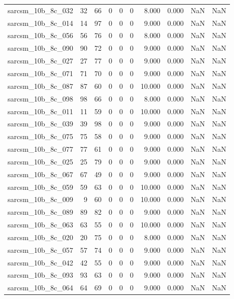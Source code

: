 \documentclass{article}
\begin{document}
\begin{longtable}{lrrrrrrrrr}
sarcsm\_10b\_8c\_032 & 32 & 66 & 0 & 0 & 0 & 8.000 & 0.000 & NaN & NaN \\
sarcsm\_10b\_8c\_014 & 14 & 97 & 0 & 0 & 0 & 9.000 & 0.000 & NaN & NaN \\
sarcsm\_10b\_8c\_056 & 56 & 76 & 0 & 0 & 0 & 8.000 & 0.000 & NaN & NaN \\
sarcsm\_10b\_8c\_090 & 90 & 72 & 0 & 0 & 0 & 9.000 & 0.000 & NaN & NaN \\
sarcsm\_10b\_8c\_027 & 27 & 77 & 0 & 0 & 0 & 9.000 & 0.000 & NaN & NaN \\
sarcsm\_10b\_8c\_071 & 71 & 70 & 0 & 0 & 0 & 9.000 & 0.000 & NaN & NaN \\
sarcsm\_10b\_8c\_087 & 87 & 60 & 0 & 0 & 0 & 10.000 & 0.000 & NaN & NaN \\
sarcsm\_10b\_8c\_098 & 98 & 66 & 0 & 0 & 0 & 8.000 & 0.000 & NaN & NaN \\
sarcsm\_10b\_8c\_011 & 11 & 59 & 0 & 0 & 0 & 10.000 & 0.000 & NaN & NaN \\
sarcsm\_10b\_8c\_039 & 39 & 98 & 0 & 0 & 0 & 9.000 & 0.000 & NaN & NaN \\
sarcsm\_10b\_8c\_075 & 75 & 58 & 0 & 0 & 0 & 9.000 & 0.000 & NaN & NaN \\
sarcsm\_10b\_8c\_077 & 77 & 61 & 0 & 0 & 0 & 9.000 & 0.000 & NaN & NaN \\
sarcsm\_10b\_8c\_025 & 25 & 79 & 0 & 0 & 0 & 9.000 & 0.000 & NaN & NaN \\
sarcsm\_10b\_8c\_067 & 67 & 49 & 0 & 0 & 0 & 9.000 & 0.000 & NaN & NaN \\
sarcsm\_10b\_8c\_059 & 59 & 63 & 0 & 0 & 0 & 10.000 & 0.000 & NaN & NaN \\
sarcsm\_10b\_8c\_009 & 9 & 60 & 0 & 0 & 0 & 10.000 & 0.000 & NaN & NaN \\
sarcsm\_10b\_8c\_089 & 89 & 82 & 0 & 0 & 0 & 9.000 & 0.000 & NaN & NaN \\
sarcsm\_10b\_8c\_063 & 63 & 55 & 0 & 0 & 0 & 10.000 & 0.000 & NaN & NaN \\
sarcsm\_10b\_8c\_020 & 20 & 75 & 0 & 0 & 0 & 8.000 & 0.000 & NaN & NaN \\
sarcsm\_10b\_8c\_057 & 57 & 74 & 0 & 0 & 0 & 9.000 & 0.000 & NaN & NaN \\
sarcsm\_10b\_8c\_042 & 42 & 55 & 0 & 0 & 0 & 9.000 & 0.000 & NaN & NaN \\
sarcsm\_10b\_8c\_093 & 93 & 63 & 0 & 0 & 0 & 9.000 & 0.000 & NaN & NaN \\
sarcsm\_10b\_8c\_064 & 64 & 69 & 0 & 0 & 0 & 9.000 & 0.000 & NaN & NaN \\

\end{longtable}
\end{document}
